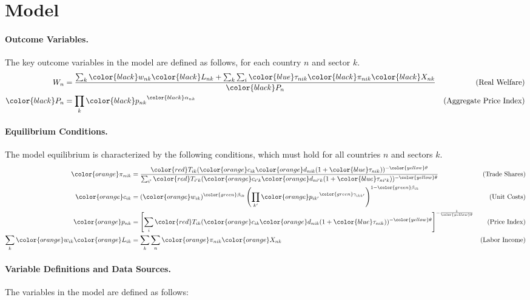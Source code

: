 \section{Model}
\paragraph{Outcome Variables.} The key outcome variables in the model are defined as follows, for each country $n$ and sector $k$.
\begin{align*}
    W_n &= \frac{\sum_{k} {\color{black}w_{nk}} {\color{black}L_{nk}} + \sum_{k} \sum_{i} {\color{blue}\tau_{nik}} {\color{black}\pi_{nik}} {\color{black}X_{nk}}}{{\color{black}P_n}} & \text{(Real Welfare)} \\
    {\color{black}P_n} &= \prod_{k} {\color{black}p_{nk}}^{{\color{black}\alpha_{nk}}} & \text{(Aggregate Price Index)}
\end{align*}

\paragraph{Equilibrium Conditions.} The model equilibrium is characterized by the following conditions, which must hold for all countries $n$ and sectors $k$.
\begin{align*}
    {\color{orange}\pi_{nik}} &= \frac{{\color{red}T_{ik}} ({\color{orange}c_{ik}} {\color{orange}d_{nik}} (1 + {\color{blue}\tau_{nik}}))^{-{\color{yellow}\theta}}}{\sum_{i'} {\color{red}T_{i'k}} ({\color{orange}c_{i'k}} {\color{orange}d_{ni'k}} (1 + {\color{blue}\tau_{ni'k}}))^{-{\color{yellow}\theta}}} & \text{(Trade Shares)} \\
    {\color{orange}c_{ik}} &= ({\color{orange}w_{ik}})^{{\color{green}\beta_{ik}}} \left(\prod_{k'} {\color{orange}p_{ik'}}^{{\color{green}\gamma_{ikk'}}}\right)^{1 - {\color{green}\beta_{ik}}} & \text{(Unit Costs)} \\
    {\color{orange}p_{nk}} &= \left[ \sum_{i} {\color{red}T_{ik}} ({\color{orange}c_{ik}} {\color{orange}d_{nik}} (1 + {\color{blue}\tau_{nik}}))^{-{\color{yellow}\theta}} \right]^{-\frac{1}{{\color{yellow}\theta}}} & \text{(Price Index)} \\
   \sum_{k} {\color{orange}w_{ik}} {\color{orange}L_{ik}} &= \sum_{k} \sum_{n} {\color{orange}\pi_{nik}} {\color{orange}X_{nk}} & \text{(Labor Income)}
\end{align*}

\paragraph{Variable Definitions and Data Sources.} The variables in the model are defined as follows:

